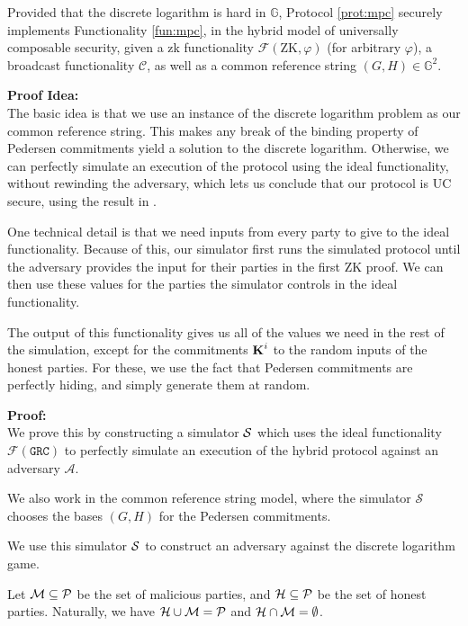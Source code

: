 \begin{claim}
Provided that the discrete logarithm is hard in $\mathbb{G}$, Protocol \ref{prot:mpc} securely implements Functionality \ref{fun:mpc},
in the hybrid model of universally composable security,
given a zk functionality $\mathcal{F}(\text{ZK}, \varphi)$ (for arbitrary $\varphi$),
a broadcast functionality $\mathcal{C}$, as well as a common reference string
${(G, H) \in \mathbb{G}^2}$.
\end{claim}
\textbf{Proof Idea:}\\
The basic idea is that we use an instance of the discrete logarithm problem
as our common reference string.
This makes any break of the binding property of Pedersen commitments
yield a solution to the discrete logarithm.
Otherwise, we can perfectly simulate an execution of the protocol
using the ideal functionality, without rewinding
the adversary, which lets us conclude that our protocol is UC secure,
using the result in \cite{kushilevitz_information-theoretically_2009}.

One technical detail is that we need inputs from every party
to give to the ideal functionality.
Because of this, our simulator first runs the simulated protocol
until the adversary provides the input for their parties in the first
ZK proof.
We can then use these values for the parties the simulator controls
in the ideal functionality.

The output of this functionality gives us all of the values we need
in the rest of the simulation, except for the commitments $\textbf{K}^i$
to the random inputs of the honest parties.
For these, we use the fact that Pedersen commitments are perfectly
hiding, and simply generate them at random.

\textbf{Proof:}\\
We prove this by constructing a simulator $\mathcal{S}$ which uses
the ideal functionality $\mathcal{F}(\texttt{GRC})$ to perfectly
simulate an execution of the hybrid protocol against an adversary
$\mathcal{A}$.

We also work in the common reference string model, where the simulator
$\mathcal{S}$ chooses the bases $(G, H)$ for the Pedersen commitments.

We use this simulator $\mathcal{S}$ to construct an adversary against
the discrete logarithm game.

Let $\mathcal{M} \subseteq \mathcal{P}$ be the set of malicious parties,
and $\mathcal{H} \subseteq \mathcal{P}$ be the set of honest parties. Naturally,
we have $\mathcal{H} \cup \mathcal{M} = \mathcal{P}$ and $\mathcal{H} \cap \mathcal{M} = \emptyset$.

